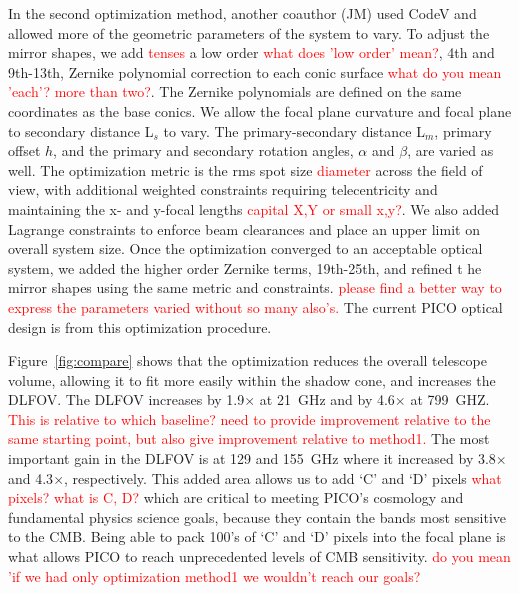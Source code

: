 \documentclass[]{spie}  %
\newcommand{\comr}[1]{\textcolor{red}{#1}}
\begin{document}
In the second optimization method, another coauthor (JM) used CodeV and allowed more of the geometric 
parameters of the system to vary.  To adjust the 
mirror shapes, we add \comr{tenses} a low order \comr{what does 'low order' mean?}, 4th and 9th-13th, 
Zernike polynomial correction to each conic surface \comr{what do you mean 'each'? more than two?}. 
The Zernike polynomials are defined on the same coordinates as the base conics.  We allow the focal plane curvature 
and focal plane to secondary distance L$_s$ to vary.  The primary-secondary distance L$_m$, primary offset $h$, 
and the primary and secondary rotation angles, $\alpha$ and $\beta$, are varied as well.  The optimization 
metric is the rms spot size \comr{diameter} across the field of view, with additional weighted constraints requiring telecentricity and 
maintaining the x- and y-focal lengths \comr{capital X,Y or small x,y?}.  We also added Lagrange constraints 
to enforce beam clearances and place an upper limit on overall system size.  Once the optimization converged to 
an acceptable optical system, we added the higher order Zernike terms, 19th-25th, and refined t
he mirror shapes using the same metric and constraints. \comr{please find a better way 
to express the parameters varied without so many also's.}
The current PICO optical design is from this optimization procedure.


Figure~\ref{fig:compare} 
shows that the optimization reduces the overall telescope volume, allowing it to fit more easily within the shadow cone, 
and increases the DLFOV.  
The DLFOV increases by 1.9$\times$ at 21~GHz and by 4.6$\times$ at 799~GHZ. \comr{This is relative to which 
baseline? need to provide improvement relative to the same starting point, but also give improvement relative 
to method1.}
The most important gain in the DLFOV is at 129 and 155~GHz where it increased by 3.8$\times$ and 4.3$\times$, respectively.  
This added area allows us to add `C' and `D' pixels \comr{what pixels? what is C, D?} which are critical to meeting PICO's 
cosmology and fundamental physics science goals, because they contain the bands most sensitive to the CMB. Being able to 
pack 100's of `C' and `D' pixels into the focal plane is what allows PICO to reach unprecedented levels of CMB sensitivity. \comr{do 
you mean 'if we had only optimization method1 we wouldn't reach our goals?}
\end{document}
